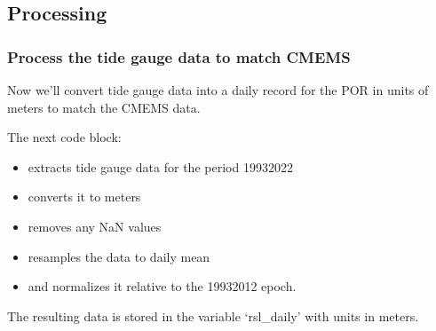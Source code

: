 \documentclass[letterpaper,10pt,english]{jupyterBook}
\begin{document}
\subsection{Processing}
\label{\detokenize{notebooks/SL_Data_Wrangling:processing}}

\subsubsection{Process the tide gauge data to match CMEMS}
\label{\detokenize{notebooks/SL_Data_Wrangling:process-the-tide-gauge-data-to-match-cmems}}
\sphinxAtStartPar
Now we’ll convert tide gauge data into a daily record for the POR in units of meters to match the CMEMS data.

\sphinxAtStartPar
The next code block:
\begin{itemize}
\item {} 
\sphinxAtStartPar
extracts tide gauge data for the period 1993\sphinxhyphen{}2022

\item {} 
\sphinxAtStartPar
converts it to meters

\item {} 
\sphinxAtStartPar
removes any NaN values

\item {} 
\sphinxAtStartPar
resamples the data to daily mean

\item {} 
\sphinxAtStartPar
and normalizes it relative to the 1993\sphinxhyphen{}2012 epoch.

\end{itemize}

\sphinxAtStartPar
The resulting data is stored in the variable ‘rsl\_daily’ with units in meters.
\end{document}
